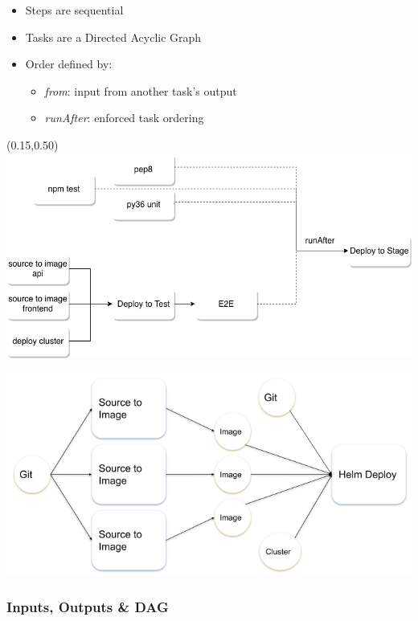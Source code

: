 \documentclass[aspectratio=169,11pt,hyperref={colorlinks=true}]{beamer}
\begin{document}
\begin{lblackrwhiteframe}
\begin{blackframe}
\begin{2columnsframe}
  {
    \begin{itemize}
      \item Steps are sequential
      \item Tasks are a Directed Acyclic Graph
      \item Order defined by:
      \begin{itemize}
        \item {\em from}: input from another task's output
        \item {\em runAfter}: enforced task ordering
      \end{itemize}
    \end{itemize}
    \begin{textblock*}{0.8\paperwidth}(0.15\paperwidth,0.50\paperheight)
      \includegraphics[width=0.45\paperwidth]{img/test-pipeline.png}
    \end{textblock*}
  }
  {
    \includegraphics[width=0.4\paperwidth]{img/pipeline.png}
  }
  \frametitle{Inputs, Outputs \& DAG}
\end{2columnsframe}


\end{blackframe}
\end{lblackrwhiteframe}
\end{document}
